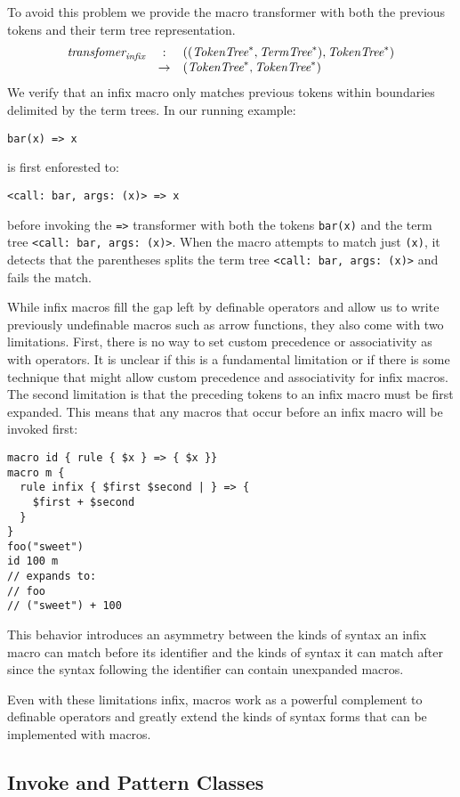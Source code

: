 \documentclass[preprint,10pt]{sigplanconf}
\begin{document}
To avoid this problem we provide the macro transformer with both the
previous tokens and their term tree representation.
\[
\begin{array}{rcl}
  \textit{transfomer}_{\textit{infix}} &:& ((\textit{TokenTree}^*, \textit{TermTree}^{*}), \textit{TokenTree}^*) 
  \\
  &\rightarrow& (\textit{TokenTree}^*, \textit{TokenTree}^*)
\end{array}
\]
We verify that an infix macro only
matches previous tokens within boundaries delimited by 
the term trees. In our running example:
\begin{lstlisting}
bar(x) => x
\end{lstlisting}
is first enforested to:
\begin{lstlisting}
<call: bar, args: (x)> => x
\end{lstlisting}
before invoking the \verb!=>! transformer with both the tokens
\verb!bar(x)! and the term tree
\verb!<call: bar, args: (x)>!. When the macro attempts to match
just \verb!(x)!, it detects that the parentheses splits the term
tree \verb!<call: bar, args: (x)>! and fails the match.

While infix macros fill the gap left by definable operators and allow
us to write previously undefinable macros such as arrow functions,
they also come with two limitations. First, there is no way to set
custom precedence or associativity as with operators. It is unclear
if this is a fundamental limitation or if there is some technique that
might allow custom precedence and associativity for infix macros.
The second limitation is that the preceding tokens to an infix macro
must be first expanded. This means that any macros that occur before
an infix macro will be invoked first:
\begin{lstlisting}
macro id { rule { $x } => { $x }}
macro m {
  rule infix { $first $second | } => {
    $first + $second   
  }
}
foo("sweet")
id 100 m
// expands to:
// foo
// ("sweet") + 100
\end{lstlisting}
This behavior introduces an asymmetry between the kinds of syntax an
infix macro can match before its identifier and the kinds of syntax it
can match after since the syntax following the identifier can contain
unexpanded macros.

Even with these limitations infix, macros work as a powerful complement
to definable operators and greatly extend the kinds of syntax forms
that can be implemented with macros.

\subsection{Invoke and Pattern Classes}
\label{sec:invoke}
\end{document}
